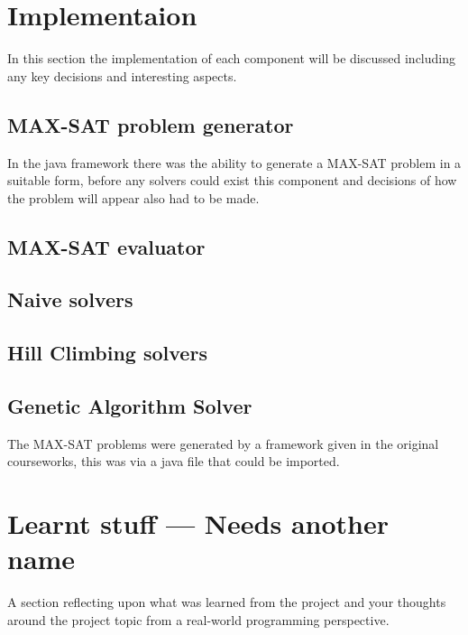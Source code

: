 \documentclass[a4paper]{article}
\begin{document}
\section{Implementaion}
In this section the implementation of each component will be discussed including any key decisions and interesting aspects.
\subsection{MAX-SAT problem generator}
In the java framework there was the ability to generate a MAX-SAT problem in a suitable form, before any solvers could exist this component and decisions of how the problem will appear also had to be made.





\subsection{MAX-SAT evaluator}
\subsection{Naive solvers}
\subsection{Hill Climbing solvers}
\subsection{Genetic Algorithm Solver}




The MAX-SAT problems were generated by a framework given in the original courseworks, this was via a java file that could be imported.

\section{Learnt stuff --- Needs another name}
A section reflecting upon what was learned from the project and your
thoughts around the project topic from a real-world programming perspective.
\end{document}
